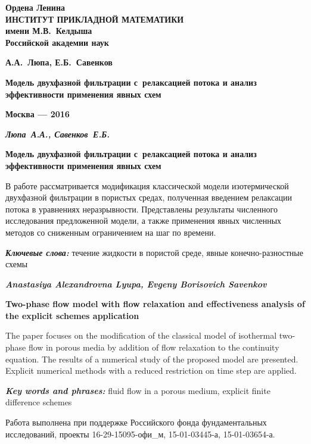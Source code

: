 \begin{titlepage}
\begin{center}

{\bf Ордена Ленина \\
ИНСТИТУТ ПРИКЛАДНОЙ МАТЕМАТИКИ \\
имени М.В.~Келдыша \\
Российской академии наук \\
\par}

\vspace{50mm}

{\bf \large А.А.~Люпа, Е.Б.~Савенков\par}

\vspace{10mm}

{\bf \Large Модель двухфазной фильтрации с~релаксацией потока
и анализ эффективности применения явных схем
\par}

\end{center}

\vspace{\fill}

\begin{center}
{\bf Москва --- 2016}
\end{center}

\clearpage
\end{titlepage}
\newpage

{\noindent \textit{ \textbf {Люпа~А.А., Савенков~Е.Б.}}} \medskip

{\bf Модель двухфазной фильтрации с~релаксацией потока
и анализ эффективности применения явных схем} \bigskip

В работе рассматривается модификация классической модели
изотермической двухфазной фильтрации в пористых средах, полученная 
введением релаксации потока в уравнениях неразрывности.
Представлены результаты численного исследования предложенной модели,
а также применения явных численных методов со сниженным ограничением на
шаг по времени. \bigskip

{\textit{ \textbf {Ключевые слова:}}} течение жидкости в пористой среде, явные конечно-разностные схемы 
\bigskip \bigskip \bigskip

{\noindent \textit{ \textbf { Anastasiya Alexandrovna Lyupa, Evgeny Borisovich Savenkov}}} \medskip

{\bf Two-phase flow model with flow relaxation
and effectiveness analysis of the explicit schemes application} \bigskip

The paper focuses on the modification of the classical model of isothermal two-phase 
flow in porous media by addition of flow relaxation to the continuity equation. 
The results of a numerical study of the proposed model are presented. 
Explicit numerical methods with a reduced restriction on time step are applied. \bigskip

{\textit{ \textbf {Key words and phrases:}}} fluid flow in a porous medium, explicit finite difference schemes 
\bigskip \bigskip \bigskip

Работа выполнена при поддержке Российского фонда фундаментальных исследований, проекты 16-29-15095-офи\_м, 15-01-03445-а, 15-01-03654-а.
\bigskip \bigskip \bigskip